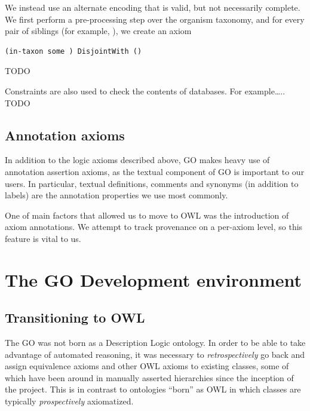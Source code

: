 \documentclass{llncs}
\begin{document}
We instead use an alternate encoding that is valid, but not
necessarily complete. We first perform a pre-processing step over the
organism taxonomy, and for every pair of siblings (for example, ), we
create an axiom

\begin{verbatim}
(in-taxon some ) DisjointWith ()
\end{verbatim}

TODO

Constraints are also used to check the contents of databases. For
example….. TODO


\subsection{Annotation axioms}

In addition to the logic axioms described above, GO makes heavy use of
annotation assertion axioms, as the textual component of GO is
important to our users. In particular, textual definitions, comments
and synonyms (in addition to labels) are the annotation properties we
use most commonly.

One of main factors that allowed us to move to OWL was the
introduction of axiom annotations. We attempt to track provenance on a
per-axiom level, so this feature is vital to us.


\section{The GO Development environment}

\subsection{Transitioning to OWL}

The GO was not born as a Description Logic ontology. In order to be
able to take advantage of automated reasoning, it was necessary to
\emph{retrospectively} go back and assign equivalence axioms and other
OWL axioms to existing classes, some of which have been around in
manually asserted hierarchies since the inception of the project. This
is in contrast to ontologies ``born'' as OWL in which classes are
typically \emph{prospectively} axiomatized.
\end{document}
